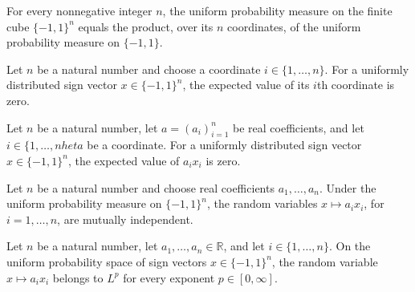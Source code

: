 \begin{theorem}
\label{FABL.rademacherMeasure_eq_pi}
\leanok
{}
For every nonnegative integer $n$, the uniform probability measure on the finite cube
$\{-1,1\}^n$ equals the product, over its $n$ coordinates, of the uniform probability
measure on $\{-1,1\}$.
\end{theorem}

\begin{theorem}
\label{FABL.integral_signCoordinate_eq_zero}
\leanok
{}
Let $n$ be a natural number and choose a coordinate $i\in\{1,\ldots,n\}$. For a
uniformly distributed sign vector $x\in\{-1,1\}^n$, the expected value of its $i$th
coordinate is zero.
\end{theorem}

\begin{theorem}
\label{FABL.integral_rademacherSummand_eq_zero}
\leanok
{}
Let $n$ be a natural number, let $a=(a_i)_{i=1}^n$ be real coefficients, and let
$i\in\{1,\ldots,n	heta$ be a coordinate. For a uniformly distributed sign vector
$x\in\{-1,1\}^n$, the expected value of $a_i x_i$ is zero.
\end{theorem}

\begin{theorem}
\label{FABL.rademacherSummands_iIndep}
\leanok
{}
Let $n$ be a natural number and choose real coefficients $a_1,\ldots,a_n$. Under the
uniform probability measure on $\{-1,1\}^n$, the random variables $x\mapsto a_i x_i$,
for $i=1,\ldots,n$, are mutually independent.
\end{theorem}

\begin{theorem}
\label{FABL.rademacherSummand_memLp}
\leanok
{}
Let $n$ be a natural number, let $a_1,\ldots,a_n\in\mathbb{R}$, and let
$i\in\{1,\ldots,n\}$. On the uniform probability space of sign vectors $x\in\{-1,1\}^n$,
the random variable $x\mapsto a_i x_i$ belongs to $L^p$ for every exponent
$p\in[0,\infty]$.
\end{theorem}

